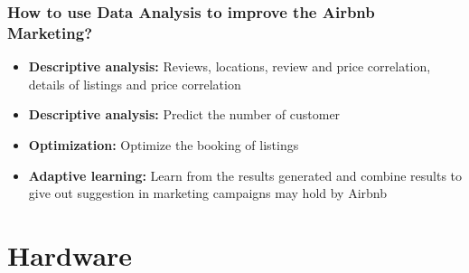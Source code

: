 \documentclass{beamer}
\begin{document}

\begin{frame}
\frametitle{How to use Data Analysis to improve the Airbnb Marketing?}
\begin{itemize}
\item \textbf{Descriptive analysis:} Reviews, locations, review and price correlation, details of listings and price correlation
\item \textbf{Descriptive analysis:} Predict the number of customer
\item \textbf{Optimization:} Optimize the booking of listings 
\item \textbf{Adaptive learning:} Learn from the results generated and combine results to give out suggestion in marketing campaigns may hold by Airbnb
\end{itemize}
\end{frame}

\section{Hardware}
\end{document}
